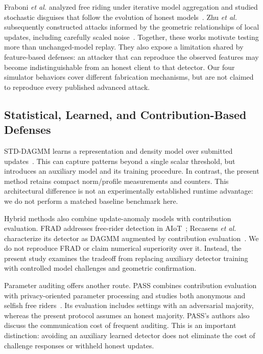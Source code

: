 \documentclass[conference]{IEEEtran}
\begin{document}
Fraboni \emph{et al.} analyzed free riding under iterative model aggregation
and studied stochastic disguises that follow the evolution of honest
models~\cite{fraboni2021freerider}. Zhu \emph{et al.} subsequently constructed
attacks informed by the geometric relationships of local updates, including
carefully scaled noise~\cite{zhu2021advanced}. Together, these works motivate
testing more than unchanged-model replay. They also expose a limitation shared
by feature-based defenses: an attacker that can reproduce the observed features
may become indistinguishable from an honest client to that detector. Our four
simulator behaviors cover different fabrication mechanisms, but are not claimed
to reproduce every published advanced attack.

\subsection{Statistical, Learned, and Contribution-Based Defenses}
STD-DAGMM learns a representation and density model over submitted
updates~\cite{lin2019freeriders}. This can capture patterns beyond a single
scalar threshold, but introduces an auxiliary model and its training procedure.
In contrast, the present method retains compact norm/profile measurements and
counters. This architectural difference is not an experimentally established
runtime advantage: we do not perform a matched baseline benchmark here.

Hybrid methods also combine update-anomaly models with contribution evaluation.
FRAD addresses free-rider detection in AIoT~\cite{wang2024frad}; Recasens
\emph{et al.} characterize its detector as DAGMM augmented by contribution
evaluation~\cite{recasens2026frida}. We do not reproduce FRAD or claim numerical
superiority over it. Instead, the present study examines the tradeoff from
replacing auxiliary detector training with controlled model challenges and
geometric confirmation.

Parameter auditing offers another route. PASS combines contribution evaluation
with privacy-oriented parameter processing and studies both anonymous and
selfish free riders~\cite{wang2024pass}. Its evaluation includes settings with
an adversarial majority, whereas the present protocol assumes an honest majority.
PASS's authors also discuss the communication cost of frequent auditing. This
is an important distinction: avoiding an auxiliary learned detector does not
eliminate the cost of challenge responses or withheld honest updates.
\end{document}
